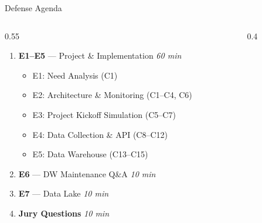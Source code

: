 \documentclass[aspectratio=169, 10pt]{beamer}
\begin{document}
\begin{frame}{Defense Agenda}
\begin{columns}[T]
\begin{column}{0.55\textwidth}
  \begin{enumerate}
    \item[\faProjectDiagram] \textbf{E1--E5} --- Project \& Implementation \hfill \textit{60 min}
    \begin{itemize}
      \item E1: Need Analysis (C1)
      \item E2: Architecture \& Monitoring (C1--C4, C6)
      \item E3: Project Kickoff Simulation (C5--C7)
      \item E4: Data Collection \& API (C8--C12)
      \item E5: Data Warehouse (C13--C15)
    \end{itemize}
    \item[\faComments] \textbf{E6} --- DW Maintenance Q\&A \hfill \textit{10 min}
    \item[\faCloud] \textbf{E7} --- Data Lake \hfill \textit{10 min}
    \item[\faQuestion] \textbf{Jury Questions} \hfill \textit{10 min}
  \end{enumerate}
\end{column}
\begin{column}{0.4\textwidth}
\end{column}
\end{columns}

\end{frame}
\end{document}
